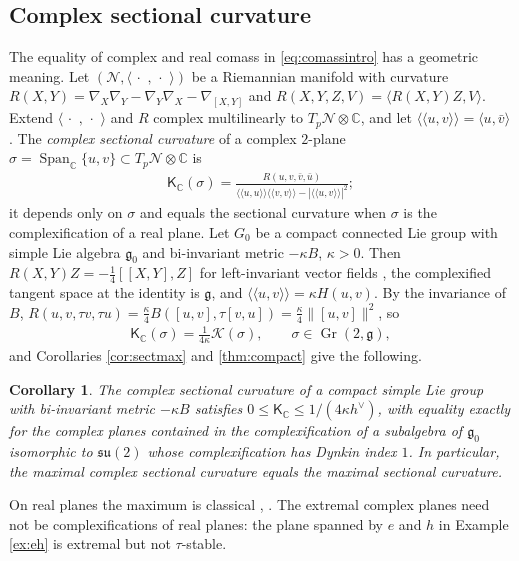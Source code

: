 \documentclass [leqno, 10pt]{amsart}
\newtheorem{corollary}[theorem]{Corollary}%
\theoremstyle{definition}
\numberwithin{equation}{section}
\newcommand{\grass}{\operatorname{Gr}}
\newcommand{\sect}{\mathscr{K}}
\newcommand{\dum}{\,\cdot\,\,}
\newcommand{\spn}{\operatorname{Span}}
\newcommand{\su}{\mathfrak{su}}
\newcommand{\g}{\mathfrak{g}}
\newcommand{\com}{\mathbb C}
\newcommand{\gz}{\g_{0}}
\newcommand{\hv}{h^\vee}
\newcommand{\norm}[1]{\lVert #1\rVert}
\begin{document}
\subsection{Complex sectional curvature}\label{sec:curvature}
The equality of complex and real comass in \eqref{eq:comassintro} has a geometric meaning. Let $(\mathcal{N}, \langle\dum, \dum\rangle)$ be a Riemannian manifold with curvature $R(X, Y) = \nabla_{X}\nabla_{Y} - \nabla_{Y}\nabla_{X} - \nabla_{[X, Y]}$ and $R(X, Y, Z, V) = \langle R(X, Y)Z, V\rangle$. Extend $\langle\dum, \dum\rangle$ and $R$ complex multilinearly to $T_{p}\mathcal{N} \otimes \com$, and let $\langle\langle u, v\rangle\rangle = \langle u, \bar{v}\rangle$. The \emph{complex sectional curvature} of a complex $2$-plane $\sigma = \spn_{\com}\{u, v\} \subset T_{p}\mathcal{N} \otimes \com$ is \cite{Micallef-Moore}
\begin{align}\label{eq:complexsectional}
\mathsf{K}_{\com}(\sigma) = \frac{R(u, v, \bar{v}, \bar{u})}{\langle\langle u, u\rangle\rangle\langle\langle v, v\rangle\rangle - |\langle\langle u, v\rangle\rangle|^{2}};
\end{align}
it depends only on $\sigma$ and equals the sectional curvature when $\sigma$ is the complexification of a real plane. Let $G_{0}$ be a compact connected Lie group with simple Lie algebra $\gz$ and bi-invariant metric $-\kappa B$, $\kappa > 0$. Then $R(X, Y)Z = -\tfrac{1}{4}[[X, Y], Z]$ for left-invariant vector fields \cite{Helgason}, the complexified tangent space at the identity is $\g$, and $\langle\langle u, v\rangle\rangle = \kappa H(u, v)$. By the invariance of $B$, $R(u, v, \tau v, \tau u) = \tfrac{\kappa}{4}B([u, v], \tau[v, u]) = \tfrac{\kappa}{4}\norm{[u, v]}^{2}$, so
\begin{align}\label{eq:KCgroup}
\mathsf{K}_{\com}(\sigma) = \frac{1}{4\kappa}\sect(\sigma), \qquad \sigma \in \grass(2, \g),
\end{align}
and Corollaries \ref{cor:sectmax} and \ref{thm:compact} give the following.
\begin{corollary}\label{cor:groupcurvature}
The complex sectional curvature of a compact simple Lie group with bi-invariant metric $-\kappa B$ satisfies $0 \leq \mathsf{K}_{\com} \leq 1/(4\kappa\hv)$, with equality exactly for the complex planes contained in the complexification of a subalgebra of $\gz$ isomorphic to $\su(2)$ whose complexification has Dynkin index $1$. In particular, the maximal complex sectional curvature equals the maximal sectional curvature.
\end{corollary}
On real planes the maximum is classical \cite[p.~334, Theorem~11.1]{Helgason-dgls}, \cite{Liu-curvatureestimates}. The extremal complex planes need not be complexifications of real planes: the plane spanned by $e$ and $h$ in Example \ref{ex:eh} is extremal but not $\tau$-stable.
\end{document}
